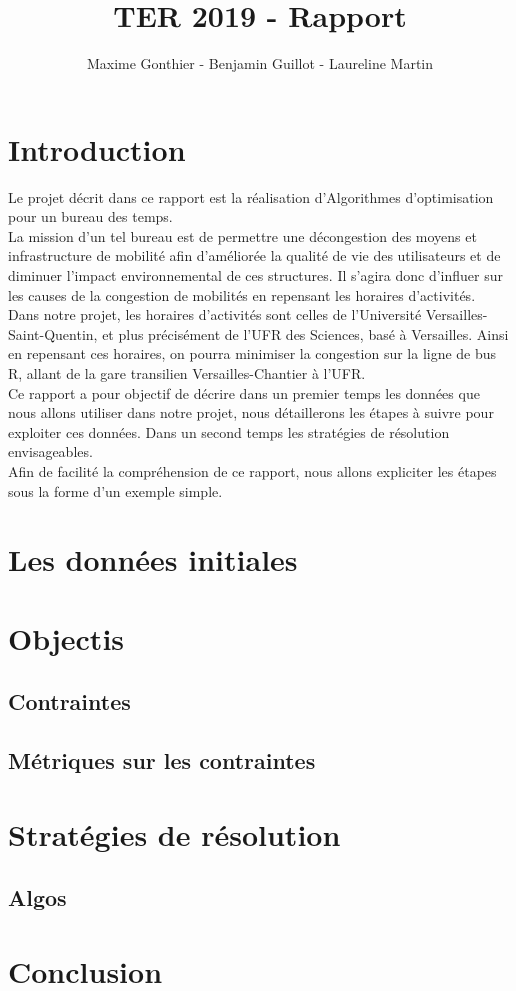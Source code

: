 \documentclass[a4paper,11pt]{article}
\title{TER 2019 - Rapport}
\author{Maxime Gonthier - Benjamin Guillot - Laureline Martin}
\begin{document}
\clearpage
\maketitle

\newpage
\tableofcontents

\newpage
\section{Introduction}
	Le projet décrit dans ce rapport est la réalisation d'Algorithmes d'optimisation pour un bureau des temps.\\
	La mission d'un tel bureau est de permettre une décongestion des moyens et infrastructure de mobilité afin d'améliorée la qualité de vie des utilisateurs	 et de diminuer l'impact environnemental de ces structures. Il s'agira donc d'influer sur les causes de la congestion de mobilités en repensant les horaires d'activités.\\
	Dans notre projet, les horaires d'activités sont celles de l'Université Versailles-Saint-Quentin, et plus précisément de l'UFR des Sciences, basé à Versailles. Ainsi en repensant ces horaires, on pourra minimiser la congestion sur la ligne de bus R, allant de la gare transilien Versailles-Chantier à l'UFR.\\
	Ce rapport a pour objectif de décrire dans un premier temps les données que nous allons utiliser dans notre projet, nous détaillerons les étapes à suivre pour exploiter ces données. Dans un second temps les stratégies de résolution envisageables.\\
	Afin de facilité la compréhension de ce rapport, nous allons expliciter les étapes sous la forme d'un exemple simple.

\section{Les données initiales}

\section{Objectis}
\subsection{Contraintes}
\subsection{Métriques sur les contraintes}

\section{Stratégies de résolution}
\subsection{Algos}


\section{Conclusion}
\end{document}
